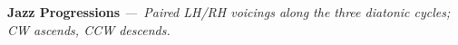 \documentclass[letterpaper,12pt]{article}
\newcounter{rowct}
\begin{document}
\small
\setcounter{rowct}{0}

\centerline{\fontsize{10}{12}\selectfont\color{flavcol}\textbf{Jazz Progressions} \itshape —\ Paired LH/RH voicings along the three diatonic cycles; CW ascends, CCW descends.}
\vspace{-2mm}

\newcommand{\cychdr}[1]{%
  \rowcolor{#1}%
  {\color{white}\textbf{LH}} & {\color{white}\textbf{RH}} & {\color{white}\textbf{Figure}} & {\color{white}\textbf{CW}} & {\color{white}\textbf{CCW}} & {\color{white}\textbf{Id}} \\
}

\setlength{\tabcolsep}{2pt}\renewcommand{\arraystretch}{1.1}

\newcommand{\cyccol}[2]{\multirow{14}{*}{\rotatebox[origin=c]{90}{\color{white}\textbf{#1}}}\hspace{0pt}}
\end{document}
